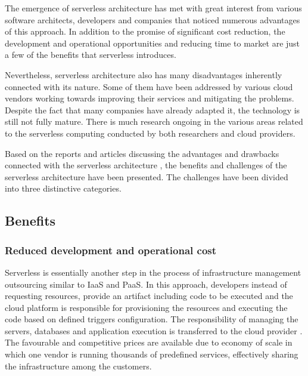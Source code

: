 The emergence of serverless architecture has met with great interest from various software architects, developers and companies that noticed numerous advantages of this approach. In addition to the promise of significant cost reduction, the development and operational opportunities and reducing time to market are just a few of the benefits that serverless introduces.

Nevertheless, serverless architecture also has many disadvantages inherently connected with its nature. Some of them have been addressed by various cloud vendors working towards improving their services and mitigating the problems. Despite the fact that many companies have already adapted it, the technology is still not fully mature. There is much research ongoing in the various areas related to the serverless computing conducted by both researchers and cloud providers.

Based on the reports and articles discussing the advantages and drawbacks connected with the serverless architecture \cite{MartinFowlerServerless} \cite{BerkeleyServerless} \cite{ServerlessComputingSurveyOfOpportunitiesChallengesApplications} \cite{LeveragingServerlessCloudComputingArchitectures}, the benefits and challenges of the serverless architecture have been presented. The challenges have been divided into three distinctive categories.

\subsection{Benefits}

\subsubsection*{Reduced development and operational cost}

Serverless is essentially another step in the process of infrastructure management outsourcing similar to IaaS and PaaS. In this approach, developers instead of requesting resources, provide an artifact including code to be executed and the cloud platform is responsible for provisioning the resources and executing the code based on defined triggers configuration. The responsibility of managing the servers, databases and application execution is transferred to the cloud provider \cite{BerkeleyServerless}. The favourable and competitive prices are available due to economy of scale in which one vendor is running thousands of predefined services, effectively sharing the infrastructure among the customers.

